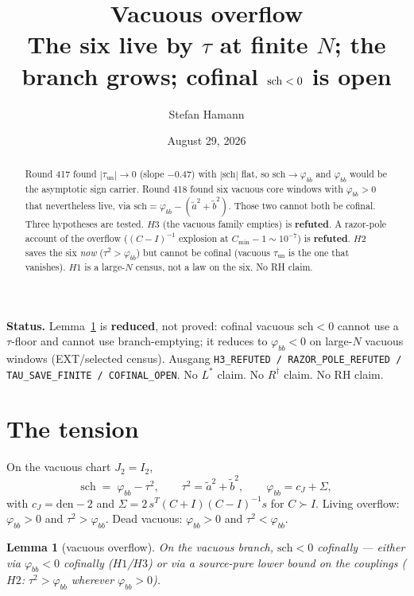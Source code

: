 \documentclass[11pt]{article}
\title{\bfseries Vacuous overflow\\[2mm]
\large The six live by $\tau$ at finite $N$;
the branch grows; cofinal $\sch<0$ is open}
\author{Stefan Hamann}
\date{August 29, 2026}
\newtheorem{lemma}{Lemma}
\theoremstyle{remark}
\newcommand{\phibb}{\varphi_{bb}}
\newcommand{\sch}{\mathrm{sch}}
\begin{document}
\maketitle

\begin{abstract}\noindent
Round 417 found $|\tau_{\mathrm{un}}|\to 0$ (slope $-0.47$)
with $|\sch|$ flat, so $\sch\to\phibb$ and $\phibb$ would be
the asymptotic sign carrier.
Round 418 found six vacuous core windows with $\phibb>0$
that nevertheless live, via
$\sch=\phibb-(\tilde a^{2}+\tilde b^{2})$.
Those two cannot both be cofinal.
Three hypotheses are tested.
$H3$ (the vacuous family empties) is \textbf{refuted}.
A razor-pole account of the overflow
($(C-I)^{-1}$ explosion at $C_{\min}-1\sim 10^{-7}$)
is \textbf{refuted}.
$H2$ saves the six \emph{now} ($\tau^{2}>\phibb$) but cannot
be cofinal (vacuous $\tau_{\mathrm{un}}$ is the one that
vanishes).  $H1$ is a large-$N$ census, not a law on the six.
No RH claim.
\end{abstract}

\medskip\noindent
\textbf{Status.}\enspace
Lemma~\ref{lem:vac} is \textbf{reduced}, not proved:
cofinal vacuous $\sch<0$ cannot use a $\tau$-floor and
cannot use branch-emptying; it reduces to $\phibb<0$ on
large-$N$ vacuous windows (EXT/selected census).
Ausgang \texttt{H3\_REFUTED / RAZOR\_POLE\_REFUTED / TAU\_SAVE\_FINITE / COFINAL\_OPEN}.
No $L^{*}$ claim.  No $R^{\dagger}$ claim.  No RH claim.

\section{The tension}\label{sec:ten}

On the vacuous chart $J_{2}=I_{2}$,
\begin{equation}\label{eq:vac}
\sch
\;=\;
\phibb-\tau^{2},
\qquad
\tau^{2}=\tilde a^{2}+\tilde b^{2},
\qquad
\phibb=c_{J}+\Sigma,
\end{equation}
with $c_{J}=\mathrm{den}-2$ and
$\Sigma=2\,s^{T}(C+I)(C-I)^{-1}s$ for $C\succ I$.
Living overflow: $\phibb>0$ and $\tau^{2}>\phibb$.
Dead vacuous: $\phibb>0$ and $\tau^{2}<\phibb$.

\begin{lemma}[vacuous overflow]\label{lem:vac}
On the vacuous branch, $\sch<0$ cofinally --- either via
$\phibb<0$ cofinally ($H1$/$H3$) or via a source-pure
lower bound on the couplings ($H2$: $\tau^{2}>\phibb$
wherever $\phibb>0$).
\end{lemma}
\end{document}
